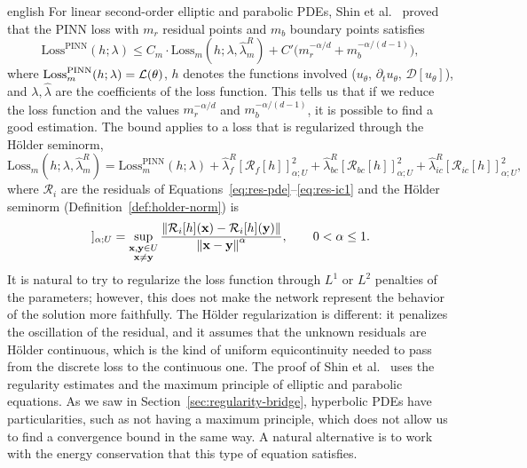 \begin{hyphenrules}{english}
For linear second-order elliptic and parabolic PDEs, Shin et al.~\cite{shin2020convergence} proved that the
PINN loss with $m_r$ residual points and $m_b$ boundary points satisfies
\begin{equation}
  \mathrm{Loss}^{\mathrm{PINN}}(h;\lambda)\le C_m\cdot\mathrm{Loss}_m(h;\lambda,\hat\lambda^{R}_m)
  +C'\big(m_r^{-\alpha/d}+m_b^{-\alpha/(d-1)}\big),
  \label{eq:shin-bound}
\end{equation}
where $\mathrm{Loss}^{\mathrm{PINN}}_m(h;\lambda)=\mathcal{L}(\theta)$, $h$ denotes the functions involved
($u_\theta$, $\partial_t u_\theta$, $\mathcal{D}[u_\theta]$), and $\lambda,\hat\lambda$ are the
coefficients of the loss function.
This tells us that if we reduce the loss function and the values $m_r^{-\alpha/d}$ and
$m_b^{-\alpha/(d-1)}$, it is possible to find a good estimation. The bound applies to a loss that is
regularized through the Hölder seminorm,
\begin{equation}
  \mathrm{Loss}_m(h;\lambda,\hat\lambda^{R}_m)=\mathrm{Loss}^{\mathrm{PINN}}_m(h;\lambda)
  +\hat\lambda^{R}_f[\mathcal{R}_f[h]]^2_{\alpha;U}+\hat\lambda^{R}_{bc}[\mathcal{R}_{bc}[h]]^2_{\alpha;U}
  +\hat\lambda^{R}_{ic}[\mathcal{R}_{ic}[h]]^2_{\alpha;U},
  \label{eq:shin-regularized}
\end{equation}
where $\mathcal{R}_i$ are the residuals of Equations~\eqref{eq:res-pde}--\eqref{eq:res-ic1} and the Hölder seminorm
(Definition~\ref{def:holder-norm}) is
\begin{equation}
  [\mathcal{R}_i[h]]_{\alpha;U}=\sup_{\substack{\mathbf{x},\mathbf{y}\in U\\ \mathbf{x}\neq\mathbf{y}}}
  \frac{\norm{\mathcal{R}_i[h](\mathbf{x})-\mathcal{R}_i[h](\mathbf{y})}}{\norm{\mathbf{x}-\mathbf{y}}^{\alpha}},\qquad0<\alpha\le1.
  \label{eq:holder-seminorm-loss}
\end{equation}
It is natural to try to regularize the loss function through $L^1$ or $L^2$ penalties of the
parameters; however, this does not make the network represent the behavior of the solution more
faithfully. The Hölder regularization is different: it penalizes the oscillation of the residual, and it
assumes that the unknown residuals are Hölder continuous, which is the kind of uniform equicontinuity
needed to pass from the discrete loss to the continuous one. The proof of Shin et al.~\cite{shin2020convergence}
uses the regularity estimates and the maximum principle of elliptic and parabolic equations. As we saw
in Section~\ref{sec:regularity-bridge}, hyperbolic PDEs have particularities, such as not having a maximum
principle, which does not allow us to find a convergence bound in the same way. A natural alternative is
to work with the energy conservation that this type of equation satisfies.


\end{hyphenrules}
